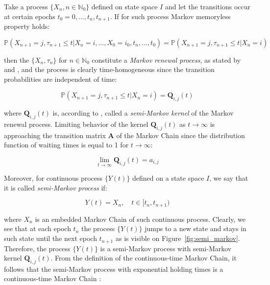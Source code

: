 Take a process $\{X_n,n \in \mathbb{N}_0\}$ defined on state space $I$ and let the transitions occur at certain epochs $t_0=0,\dots,t_n,t_{n+1}$. If for such process Markov memoryless property holds:

\begin{equation}
    \mathbb{P}(X_{n+1}=j, \tau_{n+1} \leq t|X_n=i,\ldots,X_0=i_0,t_n,\ldots,t_0) = \mathbb{P}(X_{n+1}=j, \tau_{n+1} \leq t|X_n=i)
\end{equation}

then the $\{X_n,\tau_n\}$ for $n \in \mathbb{N}_0$ constitute a \textit{Markov renewal process}, as stated by \citep{Cinlar1969} and \citep{Barbu2008}, and the process is clearly time-homogeneous since the transition probabilities are independent of time:

\begin{equation}
    \mathbb{P}(X_{n+1}=j, \tau_{n+1} \leq t|X_n=i) = \textbf{Q}_{i,j}(t)
\end{equation}

where $\textbf{Q}_{i,j}(t)$ is, according to \citep{Medhi2012}, called a \textit{semi-Markov kernel} of the Markov renewal process. Limiting behavior of the kernel $\textbf{Q}_{i,j}(t)$ as $t \to \infty$ 
is approaching the transition matrix $\textbf{A}$ of the Markov Chain since the distribution function of waiting times is equal to 1 for $t \to \infty$:

\begin{equation}
    \lim_{t \to \infty} \textbf{Q}_{i,j}(t) = a_{i,j}
\end{equation}

Moreover, for continuous process $\{Y(t)\}$ defined on a state space $I$, we say that it is called \textit{semi-Markov process} if:

\begin{equation}
    Y(t) = X_n, \quad t \in [t_n,t_{n+1})
\end{equation}

where $X_n$ is an embedded Markov Chain of such continuous process. Clearly, we see that at each epoch $t_n$ the process $\{Y(t)\}$ jumps to a new state and stays in such state until the next epoch $t_{n+1}$ as is visible on Figure~\ref{fig:semi_markov}. 
Therefore, the process $\{Y(t)\}$ is a semi-Markov process with semi-Markov kernel $\textbf{Q}_{i,j}(t)$. From the definition of the continuous-time Markov Chain, it follows that the 
semi-Markov process with exponential holding times is a continuous-time Markov Chain \citep{Sahner1996}:

